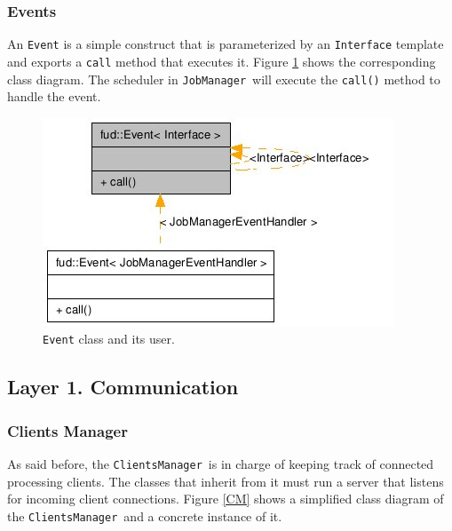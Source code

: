 \documentclass[a4paper,12pt,english]{report}
\newcommand{\JM}{\texttt{JobManager}}
\newcommand{\CM}{\texttt{ClientsManager}}
\begin{document}
\subsubsection{Events}

An \texttt{Event} is a simple construct that is parameterized by an \texttt{Interface} template and exports a \texttt{call} method that executes it. Figure \ref{event} shows the corresponding class diagram. The scheduler in \JM \ will execute the \texttt{call()} method to handle the event. 

\begin{figure}[!ht]
\begin{center}
\includegraphics [bb= 0 0 198 117]{images/Event.jpg}
\end{center}
\caption{\texttt{Event} class and its user.}
\label{event}
\end{figure}

\subsection{Layer 1. Communication}

\subsubsection{Clients Manager}

As said before, the \CM \ is in charge of keeping track of connected processing clients. The classes that inherit from it must run a server that listens for incoming client connections. Figure \ref{CM} shows a simplified class diagram of the \CM \ and a concrete instance of it.
\end{document}
